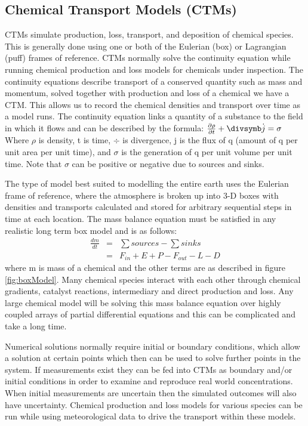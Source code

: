 \subsection{Chemical Transport Models (CTMs)}
CTMs simulate production, loss, transport, and deposition of chemical species.
This is generally done using one or both of the Eulerian (box) or Lagrangian (puff) frames of reference.
CTMs normally solve the continuity equation while running chemical production and loss models for chemicals under inspection. 
The continuity equations describe transport of a conserved quantity such as mass and momentum, solved together with production and loss of a chemical we have a CTM.
This allows us to record the chemical densities and transport over time as a model runs.
The continuity equation links a quantity of a substance to the field in which it flows and can be described by the formula:
$ \frac{\partial \rho}{\partial t} + \divsymb \dot j = \sigma $
Where $\rho$ is density, t is time, $\div$ is divergence, j is the flux of q (amount of q per unit area per unit time), and $\sigma$ is the generation of q per unit volume per unit time.
Note that $\sigma$ can be positive or negative due to sources and sinks.

The type of model best suited to modelling the entire earth uses the Eulerian frame of reference, where the atmosphere is broken up into 3-D boxes with densities and transports calculated and stored for arbitrary sequential steps in time at each location.
The mass balance equation must be satisfied in any realistic long term box model and is as follows: 
\begin{eqnarray*}
\frac{dm}{dt} &=& \sum{sources}-\sum{sinks} \\
    &=& F_{in} + E + P - F_{out} - L - D \end{eqnarray*}
where m is mass of a chemical and the other terms are as described in figure \ref{fig:boxModel}.
Many chemical species interact with each other through chemical gradients, catalyst reactions, intermediary and direct production and loss. 
Any large chemical model will be solving this mass balance equation over highly coupled arrays of partial differential equations and this can be complicated and take a long time.

Numerical solutions normally require initial or boundary conditions, which allow a solution at certain points which then can be used to solve further points in the system.
If measurements exist they can be fed into CTMs as boundary and/or initial conditions in order to examine and reproduce real world concentrations.
When initial measurements are uncertain then the simulated outcomes will also have uncertainty.
Chemical production and loss models for various species can be run while using meteorological data to drive the transport within these models.

